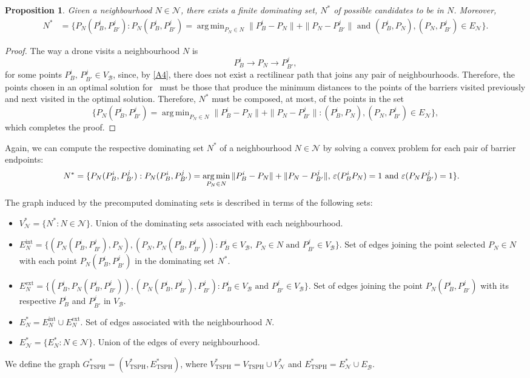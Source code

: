 \documentclass[a4paper,  review, authoryear, 1p.]{elsarticle}
\DeclareMathOperator*{\argmin}{arg\,min}
\newcommand{\TSPHN}{{\sf{H-TSPHN}\xspace }}
\newcommand{\VB}{{V^{}_{\mathcal B}}}
\newcommand{\EB}{{E^{}_{\mathcal B}}}
\newcommand{\EN}{{E^{}_{\mathcal N}}}
\newcommand{\VTSPH}{{V_{\text{TSPH}}}}
\newcommand{\GTSPHS}{{G^{*}_{\text{TSPH}}}}
\newcommand{\VTSPHS}{{V^{*}_{\text{TSPH}}}}
\newcommand{\ETSPHS}{{E^{*}_{\text{TSPH}}}}
\newtheorem{prop}{Proposition}
\begin{document}
	\begin{prop}
		Given a neighbourhood $N\in\mathcal N$, there exists a finite dominating set, $N^*$ of possible candidates to be in $N$. Moreover,
		\begin{align*}
			N^*&=\{P_N(P_{B}^i, P_{B'}^j):P_N(P_{B}^i, P_{B'}^j)=\argmin_{P_N\in N} \|P_B^i - P_N\| + \|P_N - P_{B'}^j\|\text{ and }(P_B^i, P_N), (P_N, P_{B'}^j)\in \EN\}.
		\end{align*}
	\end{prop}
	\begin{proof}
		The way a drone visits a neighbourhood $N$ is
		$$P_{B}^i\longrightarrow P_N\longrightarrow P_{B'}^j,$$
		for some points $P_B^i,\, P_{B'}^j\in \VB$, since, by \ref{A4}, there does not exist a rectilinear path that joins any pair of neighbourhoods. Therefore, the points chosen in an optimal solution for \TSPHN \ must be those that produce the minimum distances to the points of the barriers visited previously and next visited in the optimal solution. Therefore, $N^*$ must be composed, at most, of the points in the set
		$$
		\{P_N(P_{B}^i, P_{B'}^j)=\argmin_{P_N\in N} \|P_B^i - P_N\| + \|P_N - P_{B'}^j\| :(P_B^i, P_N), (P_N, P_{B'}^j)\in \EN\},
		$$
		which completes the proof.
	\end{proof}
	Again, we can compute the respective dominating set $N^*$ of a neighbourhood $N\in\mathcal N$ by solving a convex problem for each pair of barrier endpoints: %
	\begin{align*}
		N^*&=\{P_N(P_{B}^i, P_{B'}^j):P_N(P_{B}^i, P_{B'}^j)=\argmin_{P_N\in N} \|P_B^i - P_N\| + \|P_N - P_{B'}^j\|,\,\varepsilonvar{P_B^i}{P_N} = 1 \text{ and } \varepsilonvar{P_N}{P_{B'}^j} = 1\}.
	\end{align*}
	
	
	The graph induced by the precomputed dominating sets is described in terms of the following sets:
	\begin{itemize}
		\item $V_\mathcal N^*=\{N^*:N\in\mathcal N\}$. Union of the dominating sets associated with each neighbourhood.
		\item $E_N^{\text{int}}=\{(P_N(P_B^i, P_{B'}^j), P_N), (P_N, P_N(P_B^i, P_{B'}^j)) :P_B^i\in\VB,\,P_N\in N\text{ and }P_{B'}^j\in\VB\}.$ Set of edges joining the point selected $P_N\in N$ with each point $P_N(P_B^i, P_{B'}^j)$ in the dominating set $N^*$.
		\item $E_N^{\text{ext}}=\{(P_B^i, P_N(P_B^i, P_{B'}^j)), (P_N(P_B^i, P_{B'}^j), P_{B'}^j):P_B^i\in\VB\text{ and }P_{B'}^j\in\VB\}.$ Set of edges joining the point $P_N(P_B^i, P_{B'}^j)$ with its respective $P_B^i$ and $P_{B'}^j$ in $\VB$.
		\item $E_N^*=E_N^{\text{int}}\cup E_N^{\text{ext}}$. Set of edges associated with the neighbourhood $N$.
		\item $E_\mathcal N^*= \{E_N^*:N\in\mathcal N\}.$ Union of the edges of every neighbourhood.
	\end{itemize}
	We define the graph $\GTSPHS=(\VTSPHS, \ETSPHS)$, where $\VTSPHS=\VTSPH\cup V^*_\mathcal N$ and $\ETSPHS=E^*_\mathcal N\cup\EB$.
	
\end{document}
